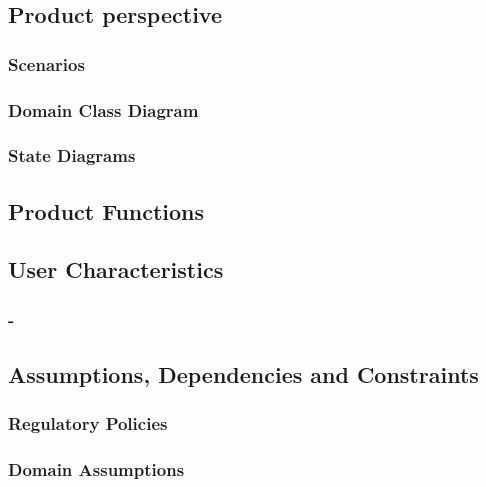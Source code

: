 \subsection{Product perspective}

\subsubsection{Scenarios}

\subsubsection{Domain Class Diagram}

\subsubsection{State Diagrams}

\subsection{Product Functions}

\subsection{User Characteristics}

\subsubsection{-}

\subsection{Assumptions, Dependencies and Constraints}

\subsubsection{Regulatory Policies}

\subsubsection{Domain Assumptions}
